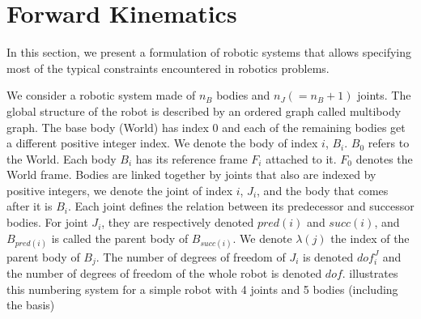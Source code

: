 



\section{Forward Kinematics}
\label{sec:forward_kinematics}


In this section, we present a formulation of robotic systems that allows specifying most of the typical constraints encountered in robotics problems.

We consider a robotic system made of $n_B$ bodies and $n_J(=n_B+1)$ joints.
The global structure of the robot is described by an ordered graph called multibody graph.
The base body (World) has index $0$ and each of the remaining bodies get a different positive integer index.
We denote the body of index $i$, $B_i$.
$B_0$ refers to the World.
Each body $B_i$ has its reference frame $F_i$ attached to it.
$F_0$ denotes the World frame.
Bodies are linked together by joints that also are indexed by positive integers, we denote the joint of index $i$, $J_i$, and the body that comes after it is $B_i$.
Each joint defines the relation between its predecessor and successor bodies.
For joint $J_i$, they are respectively denoted $pred(i)$ and $succ(i)$, and $B_{pred(i)}$ is called the parent body of $B_{succ(i)}$.
We denote $\lambda(j)$ the index of the parent body of $B_j$.
The number of degrees of freedom of $J_i$ is denoted $dof^J_i$ and the number of degrees of freedom of the whole robot is denoted $dof$.
 illustrates this numbering system for a simple robot with 4 joints and 5 bodies (including the basis)

